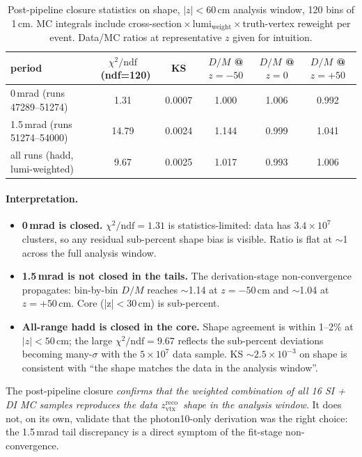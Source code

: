 \documentclass[11pt,a4paper]{article}
\newcommand{\zreco}{\ensuremath{z^{\mathrm{reco}}_{\mathrm{vtx}}}\xspace}
\newcommand{\chidf}{\ensuremath{\chi^{2}/\mathrm{ndf}}\xspace}
\begin{document}
\begin{table}[H]
  \centering
  \caption{Post-pipeline closure statistics on shape, $|z|<60$\,cm analysis window, 120 bins of 1\,cm. MC integrals include cross-section\,$\times$\,lumi$_{\mathrm{weight}}$\,$\times$\,truth-vertex reweight per event. Data/MC ratios at representative $z$ given for intuition.}
  \begin{tabular}{lccccc}
    \toprule
    period & \chidf\ (ndf=120) & KS & $D/M$ @ $z=-50$ & $D/M$ @ $z=0$ & $D/M$ @ $z=+50$ \\
    \midrule
    0\,mrad  (runs 47289--51274) & 1.31  & 0.0007 & 1.000 & 1.006 & 0.992 \\
    1.5\,mrad (runs 51274--54000) & 14.79 & 0.0024 & 1.144 & 0.999 & 1.041 \\
    all runs (hadd, lumi-weighted) & 9.67  & 0.0025 & 1.017 & 0.993 & 1.006 \\
    \bottomrule
  \end{tabular}
  \label{tab:closure}
\end{table}

\paragraph{Interpretation.}
\begin{itemize}
  \item \textbf{0\,mrad is closed.} $\chidf=1.31$ is statistics-limited: data has $3.4\times10^{7}$ clusters, so any residual sub-percent shape bias is visible. Ratio is flat at $\sim$1 across the full analysis window.
  \item \textbf{1.5\,mrad is not closed in the tails.} The derivation-stage non-convergence propagates: bin-by-bin $D/M$ reaches $\sim$1.14 at $z=-50$\,cm and $\sim$1.04 at $z=+50$\,cm. Core (|z|$<30$\,cm) is sub-percent.
  \item \textbf{All-range hadd is closed in the core.} Shape agreement is within 1--2\% at $|z|<50$\,cm; the large $\chidf=9.67$ reflects the sub-percent deviations becoming many-$\sigma$ with the $5\times10^{7}$ data sample. KS $\sim 2.5\times10^{-3}$ on shape is consistent with ``the shape matches the data in the analysis window''.
\end{itemize}

The post-pipeline closure \emph{confirms that the weighted combination of all 16 SI + DI MC samples reproduces the data \zreco\ shape in the analysis window}. It does not, on its own, validate that the photon10-only derivation was the right choice: the 1.5\,mrad tail discrepancy is a direct symptom of the fit-stage non-convergence.
\end{document}
